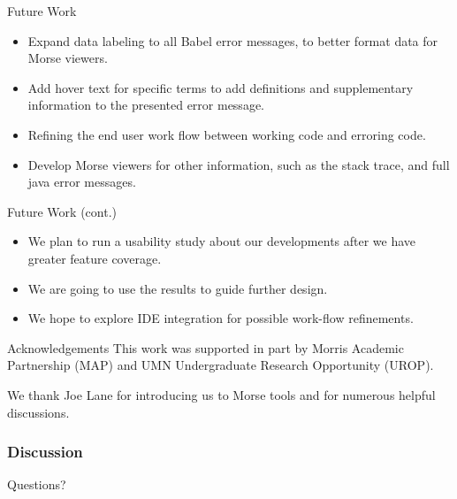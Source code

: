 \documentclass{beamer}
\begin{document}
\begin{frame}{Future Work}
  \begin{itemize}
    \item<1-> Expand data labeling to all Babel error messages, to better format data for Morse viewers.
    \item<2-> Add hover text for specific terms to add definitions and supplementary information to the presented error message.
    \item<3-> Refining the end user work flow between working code and erroring code.
    \item<4-> Develop Morse viewers for other information, such as the stack trace, and full java error messages.
  \end{itemize}
  \end{frame}

\begin{frame}{Future Work (cont.)}
  \begin{itemize}
    \item<1-> We plan to run a usability study about our developments after we have greater feature coverage.
    \item<2-> We are going to use the results to guide further design.
    \item<3-> We hope to explore IDE integration for possible work-flow refinements.
  \end{itemize}
\end{frame}

\begin{frame}{Acknowledgements}
This work was supported in part by Morris Academic Partnership (MAP) and UMN Undergraduate Research Opportunity (UROP).  \\ 

\vspace*{0.2in}

We thank Joe Lane for introducing us to Morse tools and for numerous helpful discussions.
\end{frame}

\begin{frame}
  \frametitle{Discussion}
Questions?
\end{frame}
\end{document}
